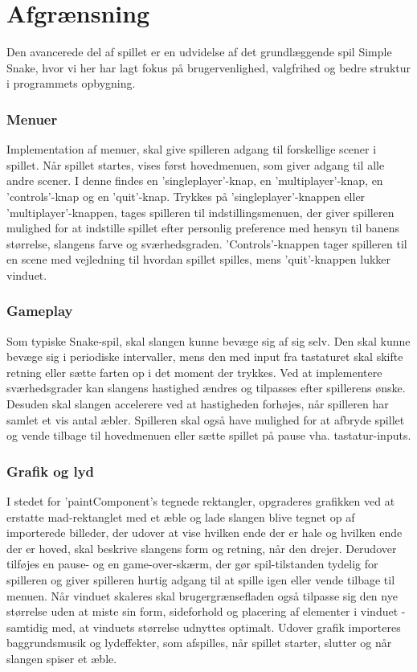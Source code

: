 \section{Afgrænsning}
Den avancerede del af spillet er en udvidelse af det grundlæggende spil Simple Snake, hvor vi her har lagt fokus på brugervenlighed, valgfrihed og bedre struktur i programmets opbygning.

\subsubsection*{Menuer}
Implementation af menuer, skal give spilleren adgang til forskellige scener i spillet. Når spillet startes, vises først hovedmenuen, som giver adgang til alle andre scener. I denne findes en 'singleplayer'-knap, en 'multiplayer'-knap, en 'controls'-knap og en 'quit'-knap. Trykkes på 'singleplayer'-knappen eller 'multiplayer'-knappen, tages spilleren til indstillingsmenuen, der giver spilleren mulighed for at indstille spillet efter personlig preference med hensyn til banens størrelse, slangens farve og sværhedsgraden. 'Controls'-knappen tager spilleren til en scene med vejledning til hvordan spillet spilles, mens 'quit'-knappen lukker vinduet.

\subsubsection*{Gameplay}
Som typiske Snake-spil, skal slangen kunne bevæge sig af sig selv. Den skal kunne bevæge sig i periodiske intervaller, mens den med input fra tastaturet skal skifte retning eller sætte farten op i det moment der trykkes. Ved at implementere sværhedsgrader kan slangens hastighed ændres og tilpasses efter spillerens ønske. Desuden skal slangen accelerere ved at hastigheden forhøjes, når spilleren har samlet et vis antal æbler. Spilleren skal også have mulighed for at afbryde spillet og vende tilbage til hovedmenuen eller sætte spillet på pause vha. tastatur-inputs.

\subsubsection*{Grafik og lyd}
I stedet for 'paintComponent's tegnede rektangler, opgraderes grafikken ved at erstatte mad-rektanglet med et æble og lade slangen blive tegnet op af importerede billeder, der udover at vise hvilken ende der er hale og hvilken ende der er hoved, skal beskrive slangens form og retning, når den drejer. Derudover tilføjes en pause- og en game-over-skærm, der gør spil-tilstanden tydelig for spilleren og giver spilleren hurtig adgang til at spille igen eller vende tilbage til menuen.
Når vinduet skaleres skal brugergrænsefladen også tilpasse sig den nye størrelse uden at miste sin form, sideforhold og placering af elementer i vinduet - samtidig med, at vinduets størrelse udnyttes optimalt. Udover grafik importeres baggrundsmusik og lydeffekter, som afspilles, når spillet starter, slutter og når slangen spiser et æble.

